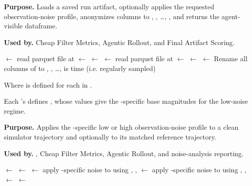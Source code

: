 \documentclass[11pt]{article}
\begin{document}
\begin{algorithm}[H]
  \caption{}
\label{def:materialize-utility}
\textbf{Purpose.} Loads a saved run artifact, optionally applies the requested observation-noise profile, anonymizes columns to , , \ldots, , and returns the agent-visible dataframe.

\textbf{Used by.} Cheap Filter Metrics, Agentic Rollout, and Final Artifact Scoring.
\par\smallskip
\begin{algorithmic}[1]
\State {} $\gets$ read parquet file at 
\State {} $\gets$ 
\State {} $\gets$ 
    \State {} $\gets$ read parquet file at 
\EndIf
{}
    \State {} $\gets$ 
    \State {} $\gets$ 
\Else
    \State {} $\gets$ 
\EndIf
\State Rename all columns of  to , , \ldots, 
\Assert {} is time (i.e. regularly sampled)
\State \Return {}
\end{algorithmic}
\end{algorithm}

Where  is defined for each \termSimulator in .

Each \termSimulator's  defines , whose values give the \termSimulator-specific base magnitudes for the low-noise regime.
\begin{algorithm}[H]
\caption{}
\label{def:add-noise-utility}
\textbf{Purpose.} Applies the \termSimulator-specific low or high observation-noise profile to a clean simulator trajectory and optionally to its matched reference trajectory.

\textbf{Used by.} , Cheap Filter Metrics, Agentic Rollout, and noise-analysis reporting.
\par\smallskip
\begin{algorithmic}[1]
\State {} $\gets$ 
\State {} $\gets$ 
\State {} $\gets$ apply \termSimulator-specific noise to  using , , 
    \State {} $\gets$ apply \termSimulator-specific noise to  using , , 
\Else
    \State {} $\gets$ 
\EndIf
\State {} $\gets$ 
\State \Return {}

\end{algorithmic}
\end{algorithm}
\end{document}
